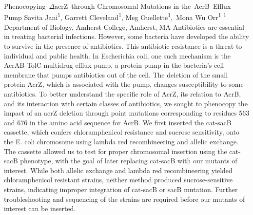 \makeabstract
    {
    Phenocopying~\ensuremath{\Delta}acrZ~through Chromosomal Mutations in the~AcrB~Efflux Pump 
    }
    {
    Savita Jani\textsuperscript{1}, Garrett Cleveland\textsuperscript{1}, Meg Ouellette\textsuperscript{1},~Mona Wu Orr\textsuperscript{1}
    }
    {
    \textsuperscript{1} Department of Biology, Amherst College, Amherst, MA
    }
    {
    Antibiotics are essential in treating bacterial infections. However, some bacteria have developed the ability to survive in the presence of antibiotics. This antibiotic resistance is a threat to individual and public health. In Escherichia coli, one such mechanism is the AcrAB-TolC multidrug efflux pump, a protein pump in the bacteria{\textquoteright}s cell membrane that pumps antibiotics out of the cell. The deletion of the small protein AcrZ, which is associated with the pump, changes susceptibility to some antibiotics. To better understand the specific role of AcrZ, its relation to AcrB, and its interaction with certain classes of antibiotics, we sought to phenocopy the impact of an acrZ deletion through point mutations corresponding to residues 563 and 676 in the amino acid sequence for AcrB.
    }
    {
    We first inserted the cat-sacB cassette, which confers chloramphenicol resistance and sucrose sensitivity, onto the E. coli chromosome using lambda red recombineering and allelic exchange. The cassette allowed us to test for proper chromosomal insertion using the cat-sacB phenotype, with the goal of later replacing cat-sacB with our mutants of interest.
    }
    {
    While both allelic exchange and lambda red recombineering yielded chloramphenicol resistant strains, neither method produced sucrose-sensitive strains, indicating improper integration of cat-sacB or sacB mutation.
    }
    {
    Further troubleshooting and sequencing of the strains are required before our mutants of interest can be inserted.
    }

    \newpage
    